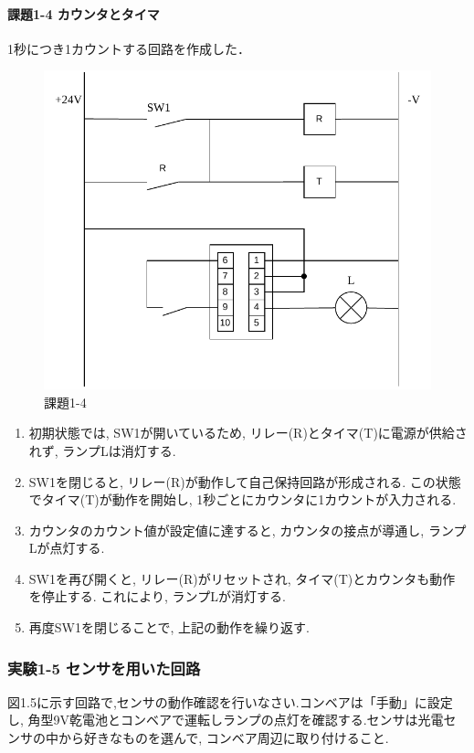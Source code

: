\paragraph{課題1-4 カウンタとタイマ}
1秒につき1カウントする回路を作成した．

\begin{figure}[H]
  \centering
  \includegraphics[scale=0.5]{sozai/17.pdf}
  \caption{課題1-4}
\end{figure}

\begin{enumerate}
  \item 初期状態では, SW1が開いているため, リレー(R)とタイマ(T)に電源が供給されず, ランプLは消灯する.
  \item SW1を閉じると, リレー(R)が動作して自己保持回路が形成される. この状態でタイマ(T)が動作を開始し, 1秒ごとにカウンタに1カウントが入力される.
  \item カウンタのカウント値が設定値に達すると, カウンタの接点が導通し, ランプLが点灯する.
  \item SW1を再び開くと, リレー(R)がリセットされ, タイマ(T)とカウンタも動作を停止する. これにより, ランプLが消灯する.
  \item 再度SW1を閉じることで, 上記の動作を繰り返す.
\end{enumerate}



\subsubsection{実験1-5 センサを用いた回路}
図1.5に示す回路で,センサの動作確認を行いなさい.コンベアは「手動」に設定し,
角型9V乾電池とコンベアで運転しランプの点灯を確認する.センサは光電センサの中から好きなものを選んで,
コンベア周辺に取り付けること.

